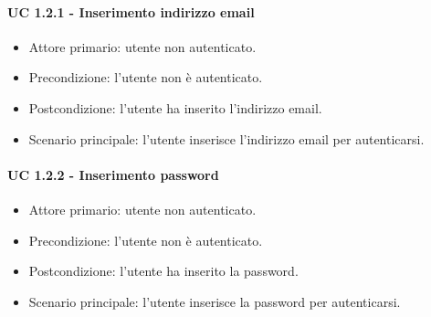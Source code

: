         \paragraph{UC 1.2.1 - Inserimento indirizzo email}
            \begin{itemize}
                \item Attore primario: utente non autenticato.
                \item Precondizione: l'utente non è autenticato.
                \item Postcondizione: l'utente ha inserito l'indirizzo email.
                \item Scenario principale: l'utente inserisce l'indirizzo email per autenticarsi.
            \end{itemize}
        \paragraph{UC 1.2.2 - Inserimento password}
            \begin{itemize}
                \item Attore primario: utente non autenticato.
                \item Precondizione: l'utente non è autenticato.
                \item Postcondizione: l'utente ha inserito la password.
                \item Scenario principale: l'utente inserisce la password per autenticarsi.
            \end{itemize}
